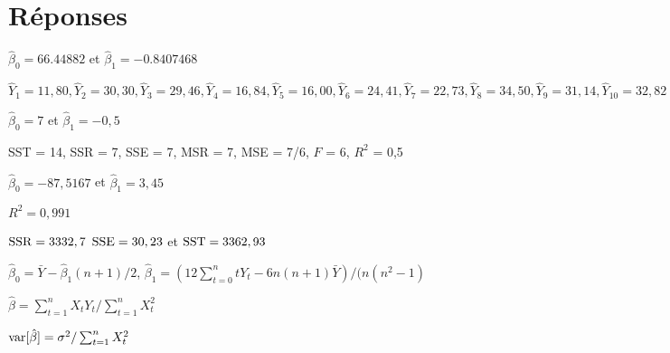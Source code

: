\bigskip
\section*{Réponses}

\begin{reponse}{2.1}
    \begin{inparaenum}
    \item $\hat{\beta}_0=66.44882$ et $\hat{\beta}_1=-0.8407468$
    \item $\hat{Y}_1 = 11,80, \hat{Y}_2 = 30,30, \hat{Y}_3 = 29,46,
      \hat{Y}_4 = 16,84, \hat{Y}_5 = 16,00, \hat{Y}_6 = 24,41,
      \hat{Y}_7 = 22,73, \hat{Y}_8 = 34,50, \hat{Y}_9 = 31,14,
      \hat{Y}_{10} = 32,82$
    \end{inparaenum}
  
\end{reponse}
\begin{reponse}{2.2}
    \begin{inparaenum}
    \item $\hat{\beta}_0=7$ et $\hat{\beta}_1=-0,5$
    \item SST = 14, SSR = 7, SSE = 7, MSR = 7, MSE = 7/6, $F$ = 6, $R^2$ = 0,5
    \end{inparaenum}
  
\end{reponse}
\begin{reponse}{2.3}
    \begin{inparaenum}
    \item
      $\hat{\beta}_0 = -87,5167$
      et
      $\hat{\beta}_1 = 3,45$
    \item $R^2 = 0,991$
    \item
      $\mathrm{SSR} = 3332,7$
      $\mathrm{SSE} = 30,23$ et
      $\mathrm{SST} = 3362,93$
    \end{inparaenum}
  
\end{reponse}
\begin{reponse}{2.5}
    $\hat{\beta}_0 = \bar{Y} - \hat{\beta}_1 (n + 1)/2$,
    $\hat{\beta}_1 = (12 \sum_{t = 0}^n t Y_t - 6 n (n + 1)
    \bar{Y})/(n (n^2 - 1)$
  
\end{reponse}
\begin{reponse}{2.6}
    \begin{inparaenum}
    \item $\hat{\beta}= \sum_{t = 1}^n X_t Y_t/\sum_{t = 1}^n X_t^2$
    \item $\mathrm{var} [ \hat{\beta} ] = \sigma^2/\sum_{t = 1}^n X_t^2$
    \end{inparaenum}
  
\end{reponse}

